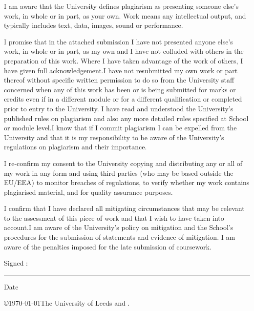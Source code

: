 
\begin{ipstatement} %

I am aware that the University defines plagiarism as presenting someone else’s work, in whole or in part, as your own. Work means any intellectual output, and typically includes text, data, images, sound or performance.

I promise that in the attached submission I have not presented anyone else’s work, in whole or in part, as my own and I have not colluded with others in the preparation of this work. Where I have taken advantage of the work of others, I have given full acknowledgement.I have not resubmitted my own work or part thereof without specific written permission to do so from the University staff concerned when any of this work has been or is being submitted for marks or credits even if in a different module or for a different qualification or completed prior to entry to the University. I have read and understood the University’s published rules on plagiarism and also any more detailed rules specified at School or module level.I know that if I commit plagiarism I can be expelled from the University and that it is my responsibility to be aware of the University’s regulations on plagiarism and their importance.

I re-confirm my consent to the University copying and distributing any or all of my work in any form and using third parties (who may be based outside the EU/EEA) to monitor breaches of regulations, to verify whether my work contains plagiarised material, and for quality assurance purposes. 

I confirm that I have declared all mitigating circumstances that may be relevant to the assessment of this piece of work and that I wish to have taken into account.I am aware of the University’s policy on mitigation and the School’s procedures for the submission of statements and evidence of mitigation. I am aware of the penalties imposed for the late submission of coursework.
\\
\vspace{1cm}

{\large Signed :\space}\rule{7cm}{0.2pt}{\large \space Date}\hrulefill\\

\hspace*{1.5cm}\theAuthor

\vspace{1cm}

\copyright \yeardate\today The University of Leeds and \theAuthor.

\end{ipstatement}


